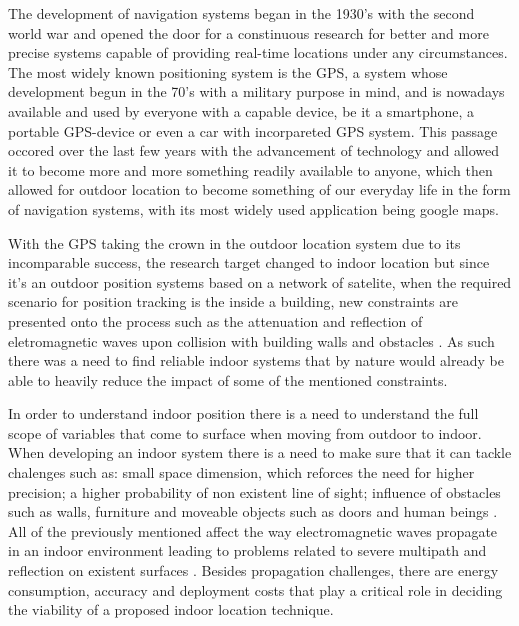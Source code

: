 \label{cap:int}


The development of navigation systems began in the 1930's with the second world war and opened the door for a constinuous research for better and more precise systems capable of providing real-time locations under any circumstances. The most widely known positioning system is the \ac{GPS}, a system whose development begun in the 70's with a military purpose in mind, and is nowadays available and used by everyone with a capable device, be it a smartphone, a portable \ac{GPS}-device or even a car with incorpareted \ac{GPS} system. This passage occored over the last few years with the advancement of technology and allowed it to become more and more something readily available to anyone, which then allowed for outdoor location to become something of our everyday life in the form of navigation systems, with its most widely used application being google maps.

With the \ac{GPS} taking the crown in the outdoor location system due to its incomparable success, the research target changed to indoor location but since it's an outdoor position systems based on a network of satelite, when the required scenario for position tracking is the inside a building, new constraints are presented onto the process such as the attenuation and reflection of eletromagnetic waves upon collision with building walls and obstacles \cite{survey2}. As such there was a need to find reliable indoor systems that by nature would already be able to heavily reduce the impact of some of the mentioned constraints.

In order to understand indoor position there is a need to understand the full scope of variables that come to surface when moving from outdoor to indoor. When developing an indoor system there is a need to make sure that it can tackle chalenges such as: small space dimension, which reforces the need for higher precision; a higher probability of non existent line of sight; influence of obstacles such as walls, furniture and moveable objects such as doors and human beings \cite{reviewtechniques}. All of the previously mentioned affect the way electromagnetic waves propagate in an indoor environment leading to problems related to severe multipath and reflection on existent surfaces \cite{surveywireless}. Besides propagation challenges, there are energy consumption, accuracy and deployment costs that play a critical role in deciding the viability of a proposed indoor location technique.

